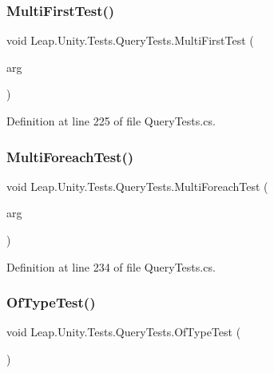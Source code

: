 \subsubsection{\texorpdfstring{MultiFirstTest()}{MultiFirstTest()}}
{\footnotesize\ttfamily void Leap.\+Unity.\+Tests.\+Query\+Tests.\+Multi\+First\+Test (\begin{DoxyParamCaption}\item[{\mbox{[}\+Value\+Source(\char`\"{}list0\char`\"{})\mbox{]} \mbox{\hyperlink{class_leap_1_1_unity_1_1_tests_1_1_query_tests_1_1_query_arg}{Query\+Arg}}}]{arg }\end{DoxyParamCaption})}



Definition at line 225 of file Query\+Tests.\+cs.

\mbox{\label{class_leap_1_1_unity_1_1_tests_1_1_query_tests_a918d08deb5b680f74921bcffb6a3fb9d}} 
\subsubsection{\texorpdfstring{MultiForeachTest()}{MultiForeachTest()}}
{\footnotesize\ttfamily void Leap.\+Unity.\+Tests.\+Query\+Tests.\+Multi\+Foreach\+Test (\begin{DoxyParamCaption}\item[{\mbox{[}\+Value\+Source(\char`\"{}list0\char`\"{})\mbox{]} \mbox{\hyperlink{class_leap_1_1_unity_1_1_tests_1_1_query_tests_1_1_query_arg}{Query\+Arg}}}]{arg }\end{DoxyParamCaption})}



Definition at line 234 of file Query\+Tests.\+cs.

\mbox{\label{class_leap_1_1_unity_1_1_tests_1_1_query_tests_ac5467e4132f5be56dc162ffdcba0d085}} 
\subsubsection{\texorpdfstring{OfTypeTest()}{OfTypeTest()}}
{\footnotesize\ttfamily void Leap.\+Unity.\+Tests.\+Query\+Tests.\+Of\+Type\+Test (\begin{DoxyParamCaption}{ }\end{DoxyParamCaption})}



